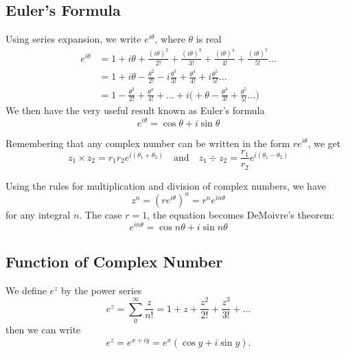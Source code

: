 \documentclass[../../../main.tex]{subfiles}
\begin{document}
\subsection{Euler's Formula}
Using series expansion, we write $e^{i\theta}$, where $\theta$ is real
\begin{align*}
    e^{i\theta} & =1+i\theta+\frac{(i\theta)^2}{2!}+\frac{(i\theta)^3}{3!}+\frac{(i\theta)^4}{4!}+\frac{(i\theta)^5}{5!}\dots           \\
                & =1+i\theta- \frac{\theta^2}{2!}-i\frac{\theta^3}{3!}+\frac{\theta^4}{4!}+i\frac{\theta^5}{5!}\dots                    \\
                & =1- \frac{\theta^2}{2!}+\frac{\theta^4}{4!}+\dots+i\biggl(+\theta-\frac{\theta^3}{3!}+\frac{\theta^5}{5!}\dots\biggr)
\end{align*}
We then have the very useful result known as Euler's formula
\begin{equation*}
        e^{i\theta}=\cos\theta+i\sin\theta 
\end{equation*}

Remembering that any complex number can be written in the form $re^{i\theta}$, we get
\begin{equation*}
    z_1\times z_2=r_1r_2e^{i(\theta_1+\theta_2)}\quad\text{and}\quad z_1\div z_2=\frac{r_1}{r_2}e^{i(\theta_1-\theta_2)}
\end{equation*}

Using the rules for multiplication and division of complex numbers, we have
\begin{equation*}
    z^n = (re^{i\theta})^n = r^ne^{in\theta}
\end{equation*}
for any integral $n$.  The case $r = 1$, the equation becomes DeMoivre's theorem:
\begin{equation*}
    e^{in\theta}=\cos n\theta + i \sin n\theta
\end{equation*}

\subsection{Function of Complex Number}
We define $e^z$ by the power series
\begin{equation*}
    e^z=\sum_{0}^{\infty}\frac{z}{n!}=1+z+\frac{z^2}{2!}+\frac{z^3}{3!}+\dots
\end{equation*}
then we can write
\begin{equation*}
    e^z=e^{x+iy}  = e^x(\cos y + i \sin y).
\end{equation*}
\end{document}
